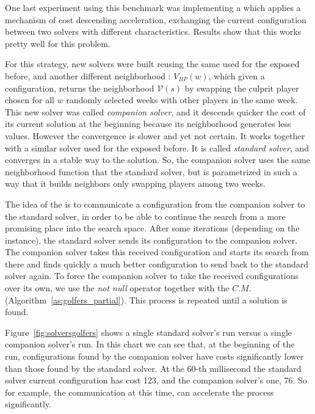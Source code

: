 \separation

One last experiment using this benchmark was implementing a \commstr{} which applies a mechanism of cost descending acceleration, exchanging the current configuration between two solvers with different characteristics. Results show that this \commstr{} works pretty well for this problem.

For this strategy, new solvers were built reusing the same \ms{} used for the \commstrs{} exposed before, and another different neighborhood \om{}: $V_{BP}(w)$, which given a configuration, returns the neighborhood $\mathcal{V}\left(s\right)$ by swapping the culprit player chosen for all $w$ randomly selected weeks with other players in the same week. This new solver was called \textit{companion solver}, and it descends quicker the cost of its current solution at the beginning because its neighborhood generates less values. However the convergence is slower and yet not certain. It works together with a similar solver used for the \commstr{} exposed before. It is called \textit{standard solver}, and converges in a stable way to the solution. So, the companion solver uses the same neighborhood function that the standard solver, but is parametrized in such a way that it builds neighbors only swapping players among two weeks.

The idea of the \commstr{} is to communicate a configuration from the companion solver to the standard solver, in order to be able to continue the search from a more promising place into the search space. After some iterations (depending on the instance), the standard solver sends its configuration to the companion solver. The companion solver takes this received configuration and starts its search from there and finds quickly a much better configuration to send back to the standard solver again. To force the companion solver to take the received configurations over its own, we use the \textit{not null} operator together with the \opch{} $C.M.$ (Algorithm~\ref{as:golfers_partial}). This process is repeated until a solution is found.

Figure~\ref{fig:solversgolfers} shows a single standard solver's run versus a single companion solver's run. In this chart we can see that, at the beginning of the run, configurations found by the companion solver have costs significantly lower than those found by the standard solver. At the 60-th millisecond the standard solver current configuration has cost 123, and the companion solver's one, 76. So for example, the communication at this time, can accelerate the process significantly.

